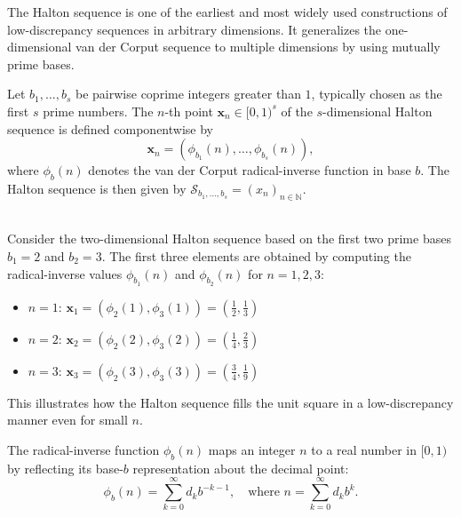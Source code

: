 The Halton sequence is one of the earliest and most widely used constructions of low-discrepancy sequences in arbitrary dimensions. It generalizes the one-dimensional van der Corput sequence to multiple dimensions by using mutually prime bases.

\begin{definition}
Let $b_1, \dots, b_s$ be pairwise coprime integers greater than $1$, typically
chosen as the first $s$ prime numbers. The $n$-th point $\boldsymbol{x}_n \in
[0,1)^s$ of the $s$-dimensional Halton sequence is defined componentwise by
\begin{equation*}
    \boldsymbol{x}_n = \left( \phi_{b_1}(n), \dots, \phi_{b_s}(n) \right),
\end{equation*}
where $\phi_b(n)$ denotes the van der Corput radical-inverse function in base
$b$. The Halton sequence is then given by $\mathcal{S}_{b_1, \dots, b_s} = (x_n)_{n\in \mathbb{N}}$.
\end{definition}

\begin{example} \ \\
Consider the two-dimensional Halton sequence based on the first two prime bases $b_1 = 2$ and $b_2 = 3$. The first three elements are obtained by computing the radical-inverse values $\phi_{b_1}(n)$ and $\phi_{b_2}(n)$ for $n = 1, 2, 3$:

\begin{itemize}
    \item $n = 1$: $\boldsymbol{x}_1 = \left( \phi_2(1), \phi_3(1) \right) = \left( \tfrac{1}{2}, \tfrac{1}{3} \right)$
    \item $n = 2$: $\boldsymbol{x}_2 = \left( \phi_2(2), \phi_3(2) \right) = \left( \tfrac{1}{4}, \tfrac{2}{3} \right)$
    \item $n = 3$: $\boldsymbol{x}_3 = \left( \phi_2(3), \phi_3(3) \right) = \left( \tfrac{3}{4}, \tfrac{1}{9} \right)$
\end{itemize}

This illustrates how the Halton sequence fills the unit square in a low-discrepancy manner even for small $n$.
\end{example}




The radical-inverse function $\phi_b(n)$ maps an integer $n$ to a real number in $[0,1)$ by reflecting its base-$b$ representation about the decimal point:
\begin{equation*}
    \phi_b(n) = \sum_{k=0}^\infty d_k b^{-k-1}, \quad \text{where } n = \sum_{k=0}^\infty d_k b^k.
\end{equation*}

